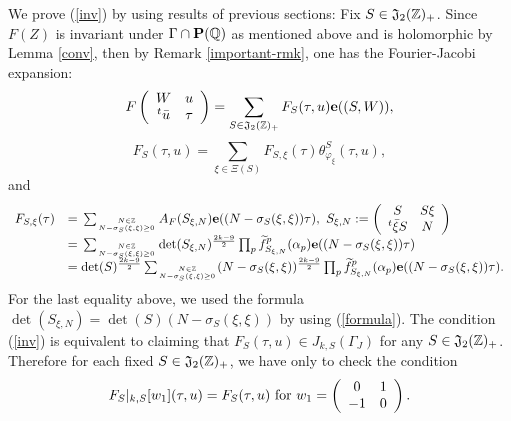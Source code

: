 \documentclass[11pt]{amsart}
\numberwithin{equation}{section}
\theoremstyle{definition}
\begin{document}
We prove (\ref{inv}) by using results of previous sections: Fix $S\in \frak J_2({\mathbb{Z}})_{+}$. 
Since $F(Z)$ is invariant under ${\Gamma}\cap \bold P({\mathbb{Q}})$ as mentioned above and is holomorphic by Lemma \ref{conv}, then by 
Remark \ref{important-rmk}, one has the Fourier-Jacobi expansion: 
\begin{equation}\label{FJ1}
F\left(\begin{array}{cc}
W & u \\
{}^t\bar{u} & \tau 
\end{array}\right)=\sum_{S\in  \frak J_2({\mathbb{Z}})_+}F_S(\tau,u)\bold{e}((S,W)), 
\end{equation} 
\begin{equation}\label{FJ2}
F_S(\tau,u)=\sum_{\xi\in \Xi(S)}F_{S,\xi}(\tau) \theta^S_{\varphi_\xi}(\tau,u), 
\end{equation}
and 
\begin{equation}\label{FJ3} 
\begin{array}{ll}
F_{S,\xi}(\tau)&={\displaystyle}\sum_{N\in {\mathbb{Z}} \atop N-\sigma_S(\xi,\xi)\ge 0}
A_F(S_{\xi,N})\bold{e}((N-\sigma_S(\xi,\xi))\tau),\ S_{\xi,N}:=\left(\begin{array}{cc}
S & S\xi \\
{}^t\bar{\xi}S & N 
\end{array}\right) \\
&={\displaystyle}\sum_{N\in {\mathbb{Z}} \atop N-\sigma_S(\xi,\xi)\ge 0}\det(S_{\xi,N})^{\frac{2k-9}{2}}
\prod_p \widetilde{f}_{S_{\xi,N}}^p(\alpha_p)\bold{e}((N-\sigma_S(\xi,\xi))\tau)\\
&=\det(S)^{\frac{2k-9}{2}}{\displaystyle}\sum_{N\in {\mathbb{Z}} \atop N-\sigma_S(\xi,\xi)\ge 0}(N-\sigma_S(\xi,\xi))^{\frac{2k-9}{2}}
\prod_p \widetilde{f}_{S_{\xi,N}}^p(\alpha_p)\bold{e}((N-\sigma_S(\xi,\xi))\tau).
\end{array}
\end{equation}
For the last equality above, we used the formula $\det(S_{\xi,N})=\det(S)(N-\sigma_S(\xi,\xi))$ by using (\ref{formula}). 
The condition (\ref{inv}) is equivalent to claiming that $F_S(\tau,u)\in J_{k,S}(\Gamma_J)$ for any $S\in \frak J_2({\mathbb{Z}})_+$. 
Therefore for each fixed $S\in \frak J_2({\mathbb{Z}})_+$, we have only to check the condition 
\begin{equation}\label{inv1}
F_S|_{k,S}[w_1](\tau,u)=F_S(\tau,u)\ {\rm for}\  
w_1=\left(\begin{array}{cc}
0 & 1 \\
-1 & 0   
\end{array}\right).
\end{equation}
\end{document}
